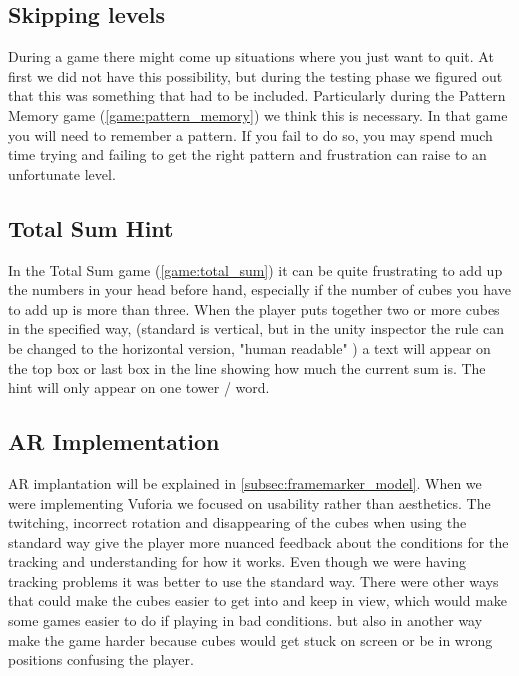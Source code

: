 \subsection{Skipping levels}
During a game there might come up situations where you just want to quit. At
first we did not have this possibility, but during the testing phase we figured
out that this was something that had to be included. Particularly during the
Pattern Memory game (\ref{game:pattern_memory}) we think this is necessary. In
that game you will need to remember a pattern. If you fail to do so, you may
spend much time trying and failing to get the right pattern and frustration can
raise to an unfortunate level. 

\subsection{Total Sum Hint}
In the Total Sum game (\ref{game:total_sum}) it can be quite frustrating to add up the numbers in your head before hand, especially if the number of cubes you have to add up is more than three. When the player puts together two or more cubes in the specified way, (standard is vertical, but in the unity inspector the rule can be changed to the horizontal version, "human readable" ) a text will appear on the top box or last box in the line showing how much the current sum is. The hint will only appear on one tower / word.

\subsection{AR Implementation}
AR implantation will be explained in \ref{subsec:framemarker_model}.
When we were implementing Vuforia we focused on usability rather than aesthetics. The twitching, incorrect rotation and disappearing of the cubes when using the standard way give the player more nuanced feedback about the conditions for the tracking and understanding for how it works. Even though we were having tracking problems it was better to use the standard way. There were other ways that could make the cubes easier to get into and keep in view, which would make some games easier to do if playing in bad conditions. but also in another way make the game harder because cubes would get stuck on screen or be in wrong positions confusing the player.



